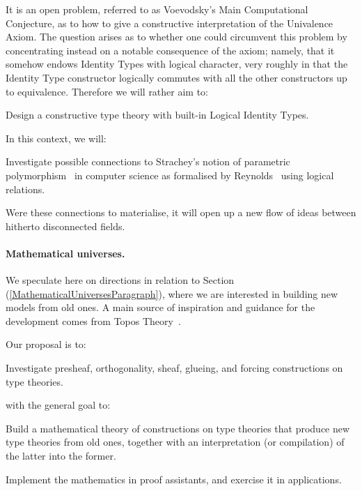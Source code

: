 \documentclass[11pt,twocolumn]{article}
\newcounter{CC}
\newenvironment{resenumerate}
  {\begin{list}{[\textbf{\arabic{CC}]}}
  {\usecounter{CC}
   \setlength{\topsep}{2pt}
   \setlength{\partopsep}{2pt}
   \setlength{\itemsep}{2.5pt}
   \setlength{\parsep}{2.5pt}
   \setlength{\leftmargin}{1.65em}
   \setlength{\labelwidth}{1.15em}
 }}
  {\end{list}}
\newcommand{\pref}[1]{\,(\ref{#1})}
\begin{document}
It is an open problem, referred to as Voevodsky's Main Computational
Conjecture, as to how to give a constructive interpretation of the Univalence
Axiom.  The question arises as to whether one could circumvent this problem by
concentrating instead on a notable consequence of the axiom; namely, that it
somehow endows Identity Types with logical character, very roughly in that the
Identity Type constructor logically commutes with all the other constructors
up to equivalence.  Therefore we will rather aim to:
\begin{resenumerate}\setcounter{CC}{7}
\item 
  Design a constructive type theory with built-in Logical Identity Types.
\end{resenumerate}
In this context, we will:
\begin{resenumerate}\setcounter{CC}{8}
\item
  Investigate possible connections to Strachey's notion of parametric
  polymorphism~\cite{Strachey1967} in computer science as formalised by
  Reynolds~\cite{Reynolds} using logical relations.
\end{resenumerate}
Were these connections to materialise, it will open up a new flow of ideas
between hitherto disconnected fields.

\paragraph{Mathematical universes.}
\label{MethodologyMathematicalUniversesParagraph}

We speculate here on directions in relation to
Section\pref{MathematicalUniversesParagraph}, where we are interested in
building new models from old ones.  A main source of inspiration and
guidance for the development comes from Topos Theory~\cite{Elephant}.

Our proposal is to:
\begin{resenumerate}\setcounter{CC}{0}
\item\label{ConstructionsOnTypeTheories}
  Investigate presheaf, orthogonality, sheaf, glueing, and forcing
  constructions on type theories.
\end{resenumerate}
with the general goal to:
\begin{resenumerate}\setcounter{CC}{1}
\item
  Build a mathematical theory of constructions on type theories that
  produce new type theories from old ones, together with an interpretation
  (or compilation) of the latter into the former.
  
\item \label{MMUPAppItem}
  Implement the mathematics in proof assistants, and exercise it in
  applications.  
\end{resenumerate}
\end{document}
